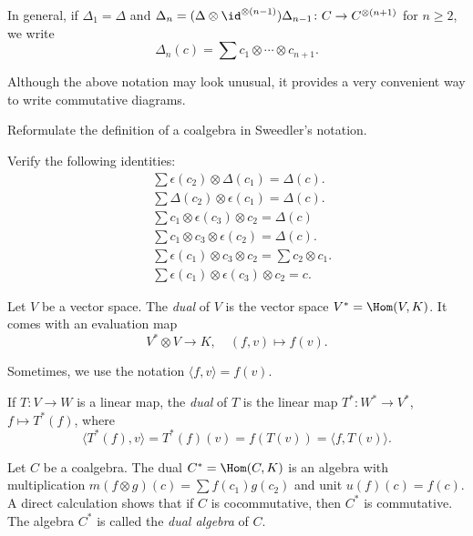 In general, if $\Delta_1=\Delta$ and 
$\Delta_n=(\Delta\otimes\id^{\otimes(n-1)})\Delta_{n-1}\colon C\to C^{\otimes(n+1)}$ for $n\geq2$, 
we write 
\[
\Delta_n(c)=\sum c_{1}\otimes\cdots\otimes c_{n+1}.
\]

Although the above notation may look unusual, it provides a very convenient way to write commutative diagrams. 

\begin{exercise}
\label{xca:coalgebra}
    Reformulate the definition of a coalgebra in Sweedler’s notation.
\end{exercise}

\begin{exercise}
\label{xca:Sweedler}
    Verify the following identities:
    \begin{align}
        &\sum\epsilon(c_{2})\otimes \Delta(c_{1})
        =\Delta(c).\\
        &\sum\Delta(c_{2})\otimes \epsilon(c_{1})=\Delta(c).\\
        &\sum c_{1}\otimes\epsilon (c_{3})\otimes c_{2}=\Delta(c)\\
        &
        \sum c_{1}\otimes c_{3}\otimes \epsilon (c_{2})=\Delta(c).\\
        &\sum \epsilon(c_{1})\otimes c_{3}\otimes c_{2}=
        \sum c_{2}\otimes c_{1}.\\
        &\sum \epsilon(c_{1})\otimes\epsilon(c_{3})\otimes c_{2}=c.
    \end{align}
\end{exercise}

Let $V$ be a vector space. The \emph{dual} of $V$ 
is the vector space $V^*=\Hom(V,K)$. It comes with 
an evaluation map
\[
V^*\otimes V\to K,\quad 
(f,v)\mapsto f(v).
\]

Sometimes, we use the notation $\langle f,v\rangle=f(v)$. 

If $T\colon V\to W$ is a linear map, 
the \emph{dual} of $T$ is the linear 
map $T^*\colon W^*\to V^*$, $f\mapsto T^*(f)$, where 
\[
\langle T^*(f),v\rangle=T^*(f)(v)=f(T(v))=\langle f,T(v)\rangle.
\]

\begin{example}
\label{exa:dual_coalgebra}
    Let $C$ be a coalgebra. The dual 
    $C^*=\Hom(C,K)$ is an algebra
    with multiplication 
    $m(f\otimes g)(c)=\sum f(c_1)g(c_2)$ 
    and unit $u(f)(c)=f(c)$. A direct calculation 
    shows that if $C$ is cocommutative, then $C^*$ is commutative. The algebra $C^*$ is called the
    \emph{dual algebra} of $C$. 
\end{example}

